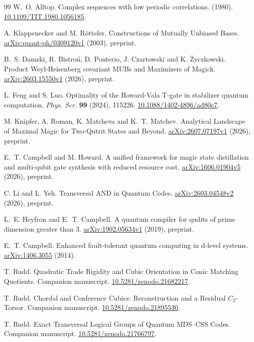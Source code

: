 \begin{thebibliography}{99}
 W.~O. Alltop. Complex sequences with low periodic correlations. (1980). \href{https://doi.org/10.1109/TIT.1980.1056185}{10.1109/TIT.1980.1056185}.

 A. Klappenecker and M. R\"otteler. Constructions of Mutually Unbiased Bases. \href{https://arxiv.org/abs/quant-ph/0309120v1}{arXiv:quant-ph/0309120v1} (2003), preprint.

 B.~S. Damski, R. Bistro\'n, D. Ponterio, J. Czartowski and K. \.Zyczkowski. Product Weyl-Heisenberg covariant MUBs and Maximizers of Magick. \href{https://arxiv.org/abs/2603.15550v1}{arXiv:2603.15550v1} (2026), preprint.

 L. Feng and S. Luo. Optimality of the Howard-Vala T-gate in stabilizer quantum computation. \emph{Phys. Scr.} \textbf{99} (2024), 115226. \href{https://doi.org/10.1088/1402-4896/ad80e7}{10.1088/1402-4896/ad80e7}.

 M. Knipfer, A. Roman, K. Matcheva and K.~T. Matchev. Analytical Landscape of Maximal Magic for Two-Qutrit States and Beyond. \href{https://arxiv.org/abs/2607.07197v1}{arXiv:2607.07197v1} (2026), preprint.

 E.~T. Campbell and M. Howard. A unified framework for magic state distillation and multi-qubit gate synthesis with reduced resource cost. \href{https://arxiv.org/abs/1606.01904v5}{arXiv:1606.01904v5} (2026), preprint.

 C. Li and L. Yeh. Transversal AND in Quantum Codes. \href{https://arxiv.org/abs/2603.04548v2}{arXiv:2603.04548v2} (2026), preprint.

 L.~E. Heyfron and E.~T. Campbell. A quantum compiler for qudits of prime dimension greater than 3. \href{https://arxiv.org/abs/1902.05634v1}{arXiv:1902.05634v1} (2019), preprint.

 E.~T. Campbell. Enhanced fault-tolerant quantum computing in d-level systems. \href{https://arxiv.org/abs/1406.3055}{arXiv:1406.3055} (2014).

 T. Rudd. Quadratic Trade Rigidity and Cubic Orientation in Conic Matching Quotients. Companion manuscript. \href{https://doi.org/10.5281/zenodo.21682217}{10.5281/zenodo.21682217}.

 T. Rudd. Chordal and Conference Cubics: Reconstruction and a Residual $C_2$-Torsor. Companion manuscript. \href{https://doi.org/10.5281/zenodo.21895530}{10.5281/zenodo.21895530}.

 T. Rudd. Exact Transversal Logical Groups of Quantum MDS--CSS Codes. Companion manuscript. \href{https://doi.org/10.5281/zenodo.21766797}{10.5281/zenodo.21766797}.

\end{thebibliography}
